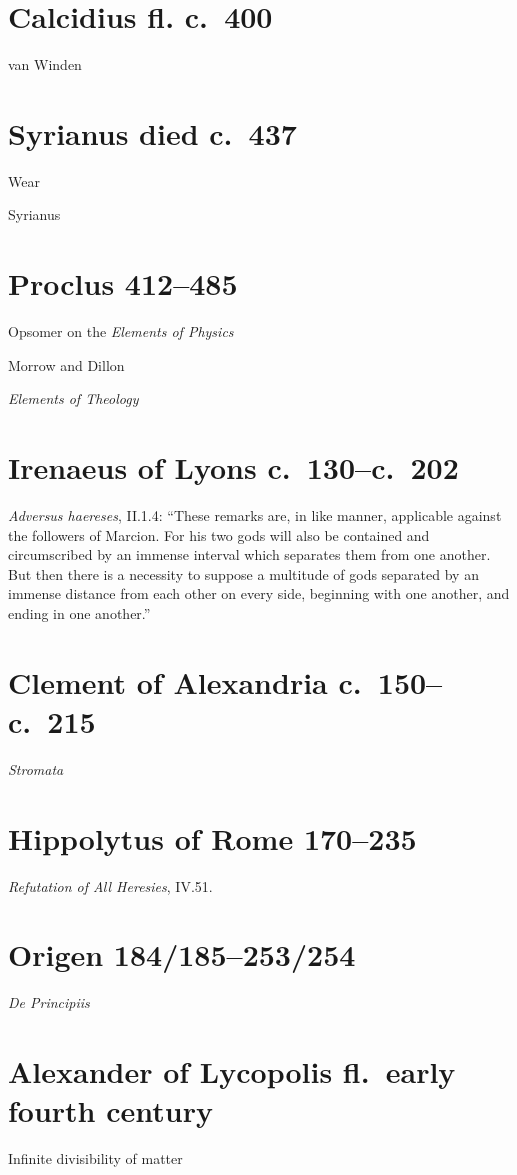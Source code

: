 \documentclass{amsart}
\theoremstyle{definition}
\begin{document}
\section{Calcidius fl. c.~400}
van Winden \cite[p.~155]{vanwinden}


\section{Syrianus died c.~437}
Wear \cite{wear}

Syrianus \cite[p.~57]{syrianus13to14}


\section{Proclus 412--485}
Opsomer \cite{opsomer} on the {\em Elements of Physics}

Morrow and Dillon \cite{proclus}

{\em Elements of Theology} \cite{dodds}


\section{Irenaeus of Lyons c.~130--c.~202}
{\em Adversus haereses}, II.1.4: ``These remarks are, in like manner, applicable against the followers of Marcion. For his two gods will also be contained and circumscribed by an immense interval which separates them from one another. But then there is a necessity to suppose a multitude of gods separated by an immense distance from each other on every side, beginning with one another, and ending in one another.''

\section{Clement of Alexandria c.~150--c.~215}
{\em Stromata}

\section{Hippolytus of Rome 170--235}
{\em Refutation of All Heresies}, IV.51.



\section{Origen 184/185--253/254}
{\em De Principiis}

\section{Alexander of Lycopolis fl.~early fourth century}
Infinite divisibility of matter \cite{lycopolis}
\end{document}

